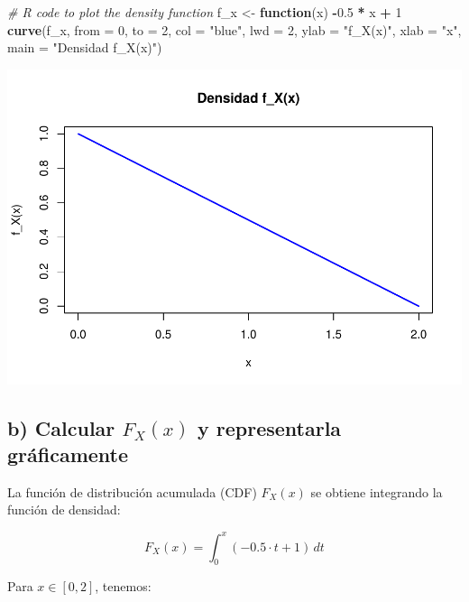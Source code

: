 \documentclass[
]{article}
\newenvironment{Shaded}{\begin{snugshade}}{\end{snugshade}}
\newcommand{\AttributeTok}[1]{\textcolor[rgb]{0.13,0.29,0.53}{#1}}
\newcommand{\CommentTok}[1]{\textcolor[rgb]{0.56,0.35,0.01}{\textit{#1}}}
\newcommand{\ControlFlowTok}[1]{\textcolor[rgb]{0.13,0.29,0.53}{\textbf{#1}}}
\newcommand{\DecValTok}[1]{\textcolor[rgb]{0.00,0.00,0.81}{#1}}
\newcommand{\FloatTok}[1]{\textcolor[rgb]{0.00,0.00,0.81}{#1}}
\newcommand{\FunctionTok}[1]{\textcolor[rgb]{0.13,0.29,0.53}{\textbf{#1}}}
\newcommand{\NormalTok}[1]{#1}
\newcommand{\OtherTok}[1]{\textcolor[rgb]{0.56,0.35,0.01}{#1}}
\newcommand{\SpecialCharTok}[1]{\textcolor[rgb]{0.81,0.36,0.00}{\textbf{#1}}}
\newcommand{\StringTok}[1]{\textcolor[rgb]{0.31,0.60,0.02}{#1}}
\begin{document}
\begin{Shaded}
\begin{Highlighting}[]
\CommentTok{\# R code to plot the density function}
\NormalTok{f\_x }\OtherTok{\textless{}{-}} \ControlFlowTok{function}\NormalTok{(x) }\SpecialCharTok{{-}}\FloatTok{0.5} \SpecialCharTok{*}\NormalTok{ x }\SpecialCharTok{+} \DecValTok{1}
\FunctionTok{curve}\NormalTok{(f\_x, }\AttributeTok{from =} \DecValTok{0}\NormalTok{, }\AttributeTok{to =} \DecValTok{2}\NormalTok{, }\AttributeTok{col =} \StringTok{"blue"}\NormalTok{, }\AttributeTok{lwd =} \DecValTok{2}\NormalTok{, }\AttributeTok{ylab =} \StringTok{"f\_X(x)"}\NormalTok{, }\AttributeTok{xlab =} \StringTok{"x"}\NormalTok{,}
      \AttributeTok{main =} \StringTok{"Densidad f\_X(x)"}\NormalTok{)}
\end{Highlighting}
\end{Shaded}

\includegraphics{Ejercicios-de-Inferencia-Estadistica_files/figure-latex/unnamed-chunk-14-1.pdf}

\subsection{\texorpdfstring{b) Calcular \(F_X(x)\) y representarla gráficamente}{b) Calcular F\_X(x) y representarla gráficamente}}\label{b-calcular-f_xx-y-representarla-gruxe1ficamente}

La función de distribución acumulada (CDF) \(F_X(x)\) se obtiene integrando la función de densidad:

\[
F_X(x) = \int_0^x (-0.5 \cdot t + 1) \, dt
\]

Para \(x \in [0, 2]\), tenemos:
\end{document}
